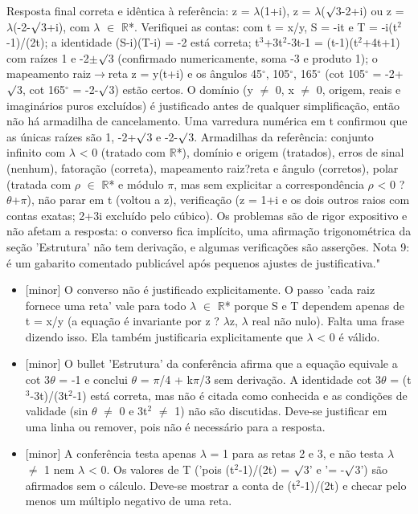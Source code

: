 \documentclass{article}%
\begin{document}
Resposta final correta e idêntica à referência: z = $\lambda$(1+i), z = $\lambda$($\surd$3-2+i) ou z = $\lambda$(-2-$\surd$3+i), com $\lambda$ $\in$ $\mathbb{R}$*. Verifiquei as contas: com t = x/y, S = -it e T = -i(t$^2$-1)/(2t); a identidade (S-i)(T-i) = -2 está correta; t$^3$+3t$^2$-3t-1 = (t-1)(t$^2$+4t+1) com raízes 1 e -2$\pm$$\surd$3 (confirmado numericamente, soma -3 e produto 1); o mapeamento raiz$\to$reta z = y(t+i) e os ângulos 45$^\circ$, 105$^\circ$, 165$^\circ$ (cot 105$^\circ$ = -2+$\surd$3, cot 165$^\circ$ = -2-$\surd$3) estão certos. O domínio (y $\neq$ 0, x $\neq$ 0, origem, reais e imaginários puros excluídos) é justificado antes de qualquer simplificação, então não há armadilha de cancelamento. Uma varredura numérica em t confirmou que as únicas raízes são 1, -2+$\surd$3 e -2-$\surd$3. Armadilhas da referência: conjunto infinito com $\lambda$ < 0 (tratado com $\mathbb{R}$*), domínio e origem (tratados), erros de sinal (nenhum), fatoração (correta), mapeamento raiz?reta e ângulo (corretos), polar (tratada com $\rho$ $\in$ $\mathbb{R}$* e módulo $\pi$, mas sem explicitar a correspondência $\rho$ < 0 ? $\theta$+$\pi$), não parar em t (voltou a z), verificação (z = 1+i e os dois outros raios com contas exatas; 2+3i excluído pelo cúbico). Os problemas são de rigor expositivo e não afetam a resposta: o converso fica implícito, uma afirmação trigonométrica da seção 'Estrutura' não tem derivação, e algumas verificações são asserções. Nota 9: é um gabarito comentado publicável após pequenos ajustes de justificativa."%
\begin{itemize}%
\item%
{[}minor{]} O converso não é justificado explicitamente. O passo 'cada raiz fornece uma reta' vale para todo $\lambda$ $\in$ $\mathbb{R}$* porque S e T dependem apenas de t = x/y (a equação é invariante por z ? $\lambda$z, $\lambda$ real não nulo). Falta uma frase dizendo isso. Ela também justificaria explicitamente que $\lambda$ < 0 é válido.%
\item%
{[}minor{]} O bullet 'Estrutura' da conferência afirma que a equação equivale a cot 3$\theta$ = -1 e conclui $\theta$ = $\pi$/4 + k$\pi$/3 sem derivação. A identidade cot 3$\theta$ = (t$^3$-3t)/(3t$^2$-1) está correta, mas não é citada como conhecida e as condições de validade (sin $\theta$ $\neq$ 0 e 3t$^2$ $\neq$ 1) não são discutidas. Deve{-}se justificar em uma linha ou remover, pois não é necessário para a resposta.%
\item%
{[}minor{]} A conferência testa apenas $\lambda$ = 1 para as retas 2 e 3, e não testa $\lambda$ $\neq$ 1 nem $\lambda$ < 0. Os valores de T ('pois (t$^2$-1)/(2t) = $\surd$3' e '= -$\surd$3') são afirmados sem o cálculo. Deve{-}se mostrar a conta de (t$^2$-1)/(2t) e checar pelo menos um múltiplo negativo de uma reta.%

\end{itemize}$$
\end{document}
